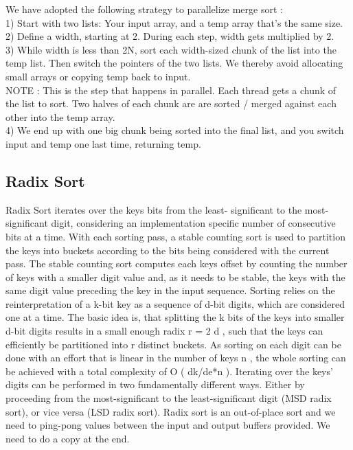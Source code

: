 \documentclass[conference]{IEEEtran}
\begin{document}
We have adopted the following strategy to parallelize merge sort :\\
1) Start with two lists: Your input array, and a temp array that’s the same size.\\
2) Define a width, starting at 2. During each step, width gets multiplied by 2.\\
3) While width is less than 2N, sort each width-sized chunk of the list into the temp list. Then switch the pointers of the two lists. We thereby avoid allocating small arrays or copying temp back to input.\\

NOTE : This is the step that happens in parallel. Each thread gets a
chunk of the list to sort.
Two halves of each chunk are are sorted / merged against
each other into the temp array.\\

4) We end up with one big chunk being sorted into the final list, and you switch input and temp one last time, returning temp.

\subsection{Radix Sort}
Radix Sort iterates over the keys bits from the least-
significant to the most-significant digit, considering an
implementation specific number of consecutive bits at a time.
With each sorting pass, a stable counting sort is used to partition the keys into buckets according to the bits being
considered with the current pass. The stable counting sort
computes each keys offset by counting the number of keys
with a smaller digit value and, as it needs to be stable,
the keys with the same digit value preceding the key in
the input sequence.
Sorting relies on the reinterpretation of a
k-bit key
as a sequence of
d-bit digits, which are considered one at
a time. The basic idea is, that splitting the
k
bits of the
keys into smaller
d-bit digits results in a small enough radix
r
= 2
d
, such that the keys can efficiently be partitioned
into
r
distinct buckets. As sorting on each digit can be
done with an effort that is linear in the number of keys
n
,
the whole sorting can be achieved with a total complexity of
O
(
dk/de*n
). Iterating over the keys’ digits can be
performed in two fundamentally different ways. Either by
proceeding from the most-significant to the least-significant
digit (MSD radix sort), or vice versa (LSD radix sort). Radix sort is an out-of-place sort and we need to ping-pong
values between the input and output buffers provided. We
need to do a copy at the end.\\
\end{document}
